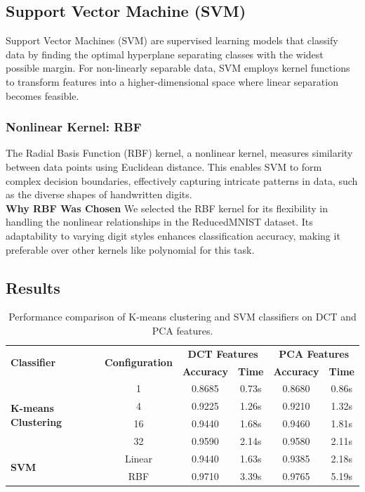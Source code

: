\documentclass[12pt]{article}
\begin{document}
\subsection{Support Vector Machine (SVM)}

Support Vector Machines (SVM) are supervised learning models that classify data by finding the optimal hyperplane separating classes with the widest possible margin. For non-linearly separable data, SVM employs kernel functions to transform features into a higher-dimensional space where linear separation becomes feasible.

\subsubsection{Nonlinear Kernel: RBF}  
The Radial Basis Function (RBF) kernel, a nonlinear kernel, measures similarity between data points using Euclidean distance. This enables SVM to form complex decision boundaries, effectively capturing intricate patterns in data, such as the diverse shapes of handwritten digits.\\
\textbf{Why RBF Was Chosen}  
We selected the RBF kernel for its flexibility in handling the nonlinear relationships in the ReducedMNIST dataset. Its adaptability to varying digit styles enhances classification accuracy, making it preferable over other kernels like polynomial for this task.\\
\newpage
\subsection{Results}
\begin{table}[h]
    \centering
    \caption{Performance comparison of K-means clustering and SVM classifiers on DCT and PCA features.}
    \label{tab:classifier_performance}
    \begin{tabular}{|l|c|c|c|c|c|}
        \hline
        \multirow{2}{*}{\textbf{Classifier}} & \multirow{2}{*}{\textbf{Configuration}} & \multicolumn{2}{c|}{\textbf{DCT Features}} & \multicolumn{2}{c|}{\textbf{PCA Features}} \\
        \cline{3-6}
        & & \textbf{Accuracy} & \textbf{Time} & \textbf{Accuracy} & \textbf{Time} \\
        \hline
        \multirow{4}{*}{\textbf{K-means Clustering}} 
        & 1 & 0.8685 & 0.73s & 0.8680 & 0.86s \\
        & 4 & 0.9225 & 1.26s & 0.9210 & 1.32s \\
        & 16 & 0.9440 & 1.68s & 0.9460 & 1.81s \\
        & 32 & 0.9590 & 2.14s & 0.9580 & 2.11s \\
        \hline
        \multirow{2}{*}{\textbf{SVM}} 
        & Linear & 0.9440 & 1.63s & 0.9385 & 2.18s \\
        & RBF & 0.9710 & 3.39s & 0.9765 & 5.19s \\
        \hline
    \end{tabular}
\end{table}
\newpage
\end{document}
